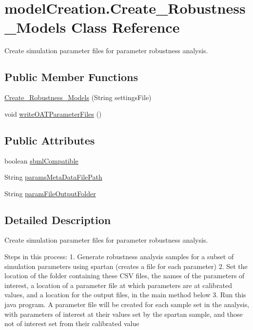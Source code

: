 \hypertarget{classmodelCreation_1_1Create__Robustness__Models}{}\section{model\+Creation.\+Create\+\_\+\+Robustness\+\_\+\+Models Class Reference}
\label{classmodelCreation_1_1Create__Robustness__Models}


Create simulation parameter files for parameter robustness analysis.  


\subsection*{Public Member Functions}
\begin{DoxyCompactItemize}
\item 
\hyperlink{classmodelCreation_1_1Create__Robustness__Models_ab4258144b80b67706aca0486a503ece5}{Create\+\_\+\+Robustness\+\_\+\+Models} (String settings\+File)
\item 
void \hyperlink{classmodelCreation_1_1Create__Robustness__Models_a49763adc938d1f68b903fef4dc530ff5}{write\+O\+A\+T\+Parameter\+Files} ()
\end{DoxyCompactItemize}
\subsection*{Public Attributes}
\begin{DoxyCompactItemize}
\item 
boolean \hyperlink{classmodelCreation_1_1Create__Robustness__Models_aff768751c3612fdc9b5afc935c0abe17}{sbml\+Compatible}
\item 
String \hyperlink{classmodelCreation_1_1Create__Robustness__Models_ad8c3635432767fd3c64c2dacc45b092d}{params\+Meta\+Data\+File\+Path}
\item 
String \hyperlink{classmodelCreation_1_1Create__Robustness__Models_a9a315c611d8f13136dc6e37482a763a4}{param\+File\+Output\+Folder}
\end{DoxyCompactItemize}


\subsection{Detailed Description}
Create simulation parameter files for parameter robustness analysis. 

Steps in this process\+: 1. Generate robustness analysis samples for a subset of simulation parameters using spartan (creates a file for each parameter) 2. Set the location of the folder containing these C\+S\+V files, the names of the parameters of interest, a location of a parameter file at which parameters are at calibrated values, and a location for the output files, in the main method below 3. Run this java program. A parameter file will be created for each sample set in the analysis, with parameters of interest at their values set by the spartan sample, and those not of interest set from their calibrated value

